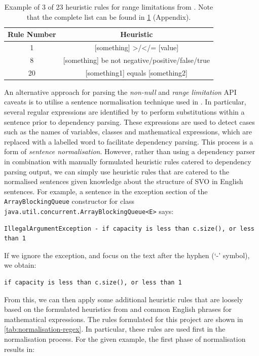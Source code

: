 \begin{table}[]
	\begin{tabular}{|cc|}
		\hline
		Rule Number & Heuristic \\ \hline
		1 & [something] >/</= [value] \\
		8 & [something] be {not} negative/positive/false/true \\
		20 & [something1] equals [something2] \\ \hline
	\end{tabular}
	\caption{Example of 3 of 23 heuristic rules for range limitations from \cite{zhou-directive}. Note that the complete list can be found in \ref{tab:range-limit-heuristic} (Appendix).}
	\label{tab:range-limit-heuristic}
\end{table}

An alternative approach for parsing the \textit{non-null} and \textit{range limitation} API caveats is to utilise a sentence normalisation technique used in \cite{zhou-directive}. In particular, several regular expressions are identified by \citeauthor{zhou-directive} to perform substitutions within a sentence prior to dependency parsing. These expressions are used to detect cases such as the names of variables, classes and mathematical expressions, which are replaced with a labelled word to facilitate dependency parsing. This process is a form of \textit{sentence normalisation}. However, rather than using a dependency parser in combination with manually formulated heuristic rules catered to dependency parsing output, we can simply use heuristic rules that are catered to the normalised sentences given knowledge about the structure of SVO in English sentences. For example, a sentence in the exception section of the \lstinline{ArrayBlockingQueue} constructor for class \lstinline{java.util.concurrent.ArrayBlockingQueue<E>} says:

\begin{verbatim}
IllegalArgumentException - if capacity is less than c.size(), or less than 1
\end{verbatim}

If we ignore the exception, and focus on the text after the hyphen (`-' symbol), we obtain:

\begin{verbatim}
if capacity is less than c.size(), or less than 1
\end{verbatim}

From this, we can then apply some additional heuristic rules that are loosely based on the formulated heuristics from \citeauthor{zhou-directive} and common English phrases for mathematical expressions. The rules formulated for this project are shown in \ref{tab:normalisation-regex}. In particular, these rules are used first in the normalisation process. For the given example, the first phase of normalisation results in:

